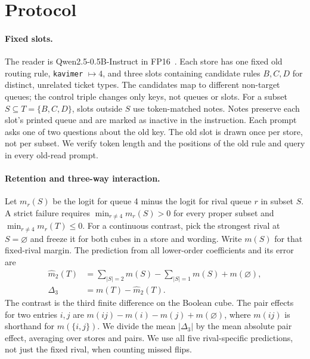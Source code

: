\section{Protocol}
\label{sec:protocol}

\paragraph{Fixed slots.}
The reader is Qwen2.5-0.5B-Instruct in FP16~\citep{qwen2024}.
Each store has one fixed old routing rule, \texttt{kavimer} $\mapsto 4$, and three slots containing candidate rules $B,C,D$ for distinct, unrelated ticket types.
The candidates map to different non-target queues; the control triple changes only keys, not queues or slots.
For a subset $S\subseteq T=\{B,C,D\}$, slots outside $S$ use token-matched notes.
Notes preserve each slot's printed queue and are marked as inactive in the instruction.
Each prompt asks one of two questions about the old key.
The old slot is drawn once per store, not per subset.
We verify token length and the positions of the old rule and query in every old-read prompt.

\paragraph{Retention and three-way interaction.}
Let $m_r(S)$ be the logit for queue 4 minus the logit for rival queue $r$ in subset $S$.
A strict failure requires $\min_{r\neq4}m_r(S)>0$ for every proper subset and $\min_{r\neq4}m_r(T)\leq0$.
For a continuous contrast, pick the strongest rival at $S=\varnothing$ and freeze it for both cubes in a store and wording.
Write $m(S)$ for that fixed-rival margin.
The prediction from all lower-order coefficients and its error are
\begin{align}
\widehat m_2(T) &= \sum_{|S|=2}m(S)-\sum_{|S|=1}m(S)+m(\varnothing), \\
\Delta_3 &= m(T)-\widehat m_2(T).
\end{align}
The contrast is the third finite difference on the Boolean cube.
The pair effects for two entries $i,j$ are $m(ij)-m(i)-m(j)+m(\varnothing)$, where $m(ij)$ is shorthand for $m(\{i,j\})$.
We divide the mean $|\Delta_3|$ by the mean absolute pair effect, averaging over stores and pairs.
We use all five rival-specific predictions, not just the fixed rival, when counting missed flips.

